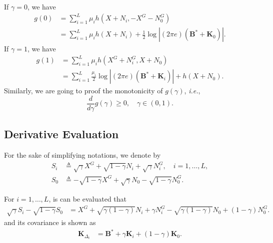 \documentclass[journal,final, onecolumn]{IEEEtran}
\begin{document}
If $\gamma=0$, we have
\begin{align}
g(0) &=\sum_{i=1}^{L} \mu_{i} h(X+N_{i}, -X^{G}-N^{G}_{0})\\
     &=\sum_{i=1}^{L} \mu_{i} h(X+N_{i})+\frac{1}{2} \log \left|   (2 \pi e) \left(\boldsymbol{B}^{*}+\boldsymbol{K}_{0}\right)      \right|.
\end{align}
If $\gamma=1$, we have
\begin{align}
g(1) &=\sum_{i=1}^{L} \mu_{i} h(X^{G}+N^{G}_{i}, X+N_{0})\\
&=\sum_{i=1}^{L} \frac{\mu_{i}}{2} \log \left|   (2 \pi e) \left(\boldsymbol{B}^{*}+\boldsymbol{K}_{i}\right)      \right|+h(X+N_{0}).
\end{align}
Similarly, we are going to proof the monotonicity of $g(\gamma)$, \emph{i.e.},
\begin{equation}
\frac{d}{d\gamma} g(\gamma) \geq 0,   \quad \gamma \in (0,1).
\end{equation}

\subsection{Derivative Evaluation}

For the sake of simplifying notations, we denote by
\begin{align}
S_{i} &\triangleq \sqrt{\gamma}X^{G}+\sqrt{1-\gamma}N_{i} + \sqrt{\gamma} N^{G}_{i}, \quad i=1,\ldots, L, \label{eq:CS1}\\
S_{0} &\triangleq -\sqrt{1-\gamma}X^{G}+ \sqrt{\gamma}N_{0}- \sqrt{1-\gamma}N^{G}_{0}. \label{eq:CS2}
\end{align}

For $i=1,\ldots, L$, is can be evaluated that
\begin{align}
\sqrt{\gamma}S_{i} - \sqrt{1-\gamma}S_{0} &= X^{G} + \sqrt{\gamma(1-\gamma)} {N}_{i} + {\gamma}N^{G}_{i} - \sqrt{\gamma(1-\gamma)} {N}_{0}+ (1-\gamma)N^{G}_{0}.
\end{align}
and its covariance is shown as
\begin{align}
\boldsymbol{K}_{\Delta_{i}} &=\boldsymbol{B}^{*} + \gamma \boldsymbol{K}_{i} + (1-\gamma) \boldsymbol{K}_{0}. \label{eqn:CKW}
\end{align}
\end{document}
